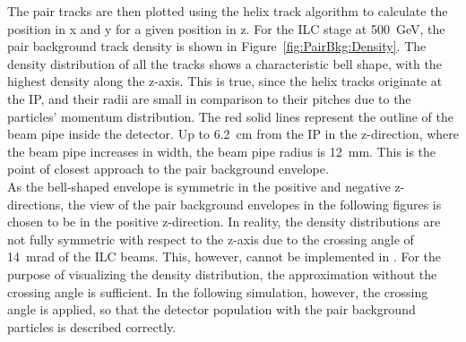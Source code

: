 The pair tracks are then plotted using the helix track algorithm to calculate the position in x and y for a given position in z.
For the ILC stage at \SI{500}{\GeV}, the pair background track density is shown in Figure~\ref{fig:PairBkg:Density}.
The density distribution of all the tracks shows a characteristic bell shape, with the highest density along the z-axis.
This is true, since the helix tracks originate at the IP, and their radii are small in comparison to their pitches due to the particles' momentum distribution.
The red solid lines represent the outline of the beam pipe inside the \sid detector.
Up to \SI{6.2}{\centi\meter} from the IP in the z-direction, where the beam pipe increases in width, the beam pipe radius is \SI{12}{\milli\meter}.
This is the point of closest approach to the pair background envelope.
\\As the bell-shaped envelope is symmetric in the positive and negative z-directions, the view of the pair background envelopes in the following figures is chosen to be in the positive z-direction.
In reality, the density distributions are not fully symmetric with respect to the z-axis due to the crossing angle of \SI{14}{\milli\radian} of the ILC beams.
This, however, cannot be implemented in \guineapig.
For the purpose of visualizing the density distribution, the approximation without the crossing angle is sufficient.
In the following \geant simulation, however, the crossing angle is applied, so that the detector population with the pair background particles is described correctly.
